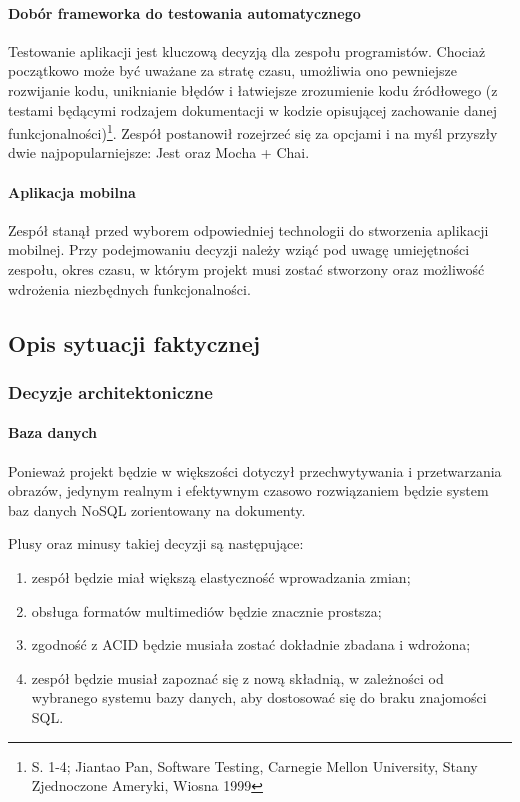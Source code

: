\documentclass[12pt, a4paper, twoside, openany]{book}
\newcommand{\forceindent}{\leavevmode{\parindent=1.3em\indent}}
\begin{document}
\paragraph{Dobór frameworka do testowania automatycznego\\}
\forceindent Testowanie aplikacji jest kluczową decyzją dla zespołu programistów.
Chociaż początkowo może być uważane za stratę czasu, umożliwia ono pewniejsze rozwijanie kodu, uniknianie błędów i łatwiejsze zrozumienie kodu źródłowego (z testami będącymi rodzajem dokumentacji w kodzie opisującej zachowanie danej funkcjonalności)\footnote{S. 1-4; Jiantao Pan, Software Testing, Carnegie Mellon University, Stany Zjednoczone Ameryki, Wiosna 1999}.
Zespół postanowił rozejrzeć się za opcjami i na myśl przyszły dwie najpopularniejsze: Jest oraz Mocha + Chai.

\paragraph{Aplikacja mobilna\\}
\forceindent Zespół stanął przed wyborem odpowiedniej technologii do stworzenia aplikacji mobilnej. Przy podejmowaniu decyzji należy wziąć pod uwagę umiejętności zespołu, okres czasu, w którym projekt musi zostać stworzony oraz możliwość wdrożenia niezbędnych funkcjonalności.

\subsection{Opis sytuacji faktycznej}

\subsubsection{Decyzje architektoniczne}

\paragraph{Baza danych\\}
\forceindent Ponieważ projekt będzie w większości dotyczył przechwytywania i przetwarzania obrazów, jedynym realnym i efektywnym czasowo rozwiązaniem będzie system baz danych NoSQL zorientowany na dokumenty.

Plusy oraz minusy takiej decyzji są następujące:
\begin{enumerate}[label=--]
    \item zespół będzie miał większą elastyczność wprowadzania zmian;
    \item obsługa formatów multimediów będzie znacznie prostsza;
    \item zgodność z ACID będzie musiała zostać dokładnie zbadana i wdrożona;
    \item zespół będzie musiał zapoznać się z nową składnią, w zależności od wybranego systemu bazy danych, aby dostosować się do braku znajomości SQL.
\end{enumerate}
\end{document}
